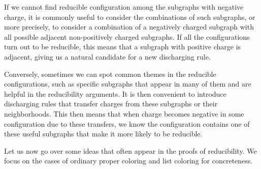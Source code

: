 \documentclass[12pt,twoside,openright,a4paper]{book}
\begin{document}
If we cannot find reducible configuration among the subgraphs with negative charge,
it is commonly useful to consider the combinations of such subgraphs, or more precisely, to consider a combination
of a negatively charged subgraph with all possible adjacent non-positively charged subgraphs.
If all the configurations turn out to be reducible, this means that a subgraph with positive charge is adjacent,
giving us a natural candidate for a new discharging rule.

Conversely, sometimes we can spot common themes in the reducible configurations, such as specific subgraphs
that appear in many of them and are helpful in the reducibility arguments. It is then convenient to introduce
discharging rules that transfer charges from these subgraphs or their neighborhoods.  This then means that
when charge becomes negative in some configuration due to these transfers, we know the configuration contains
one of these useful subgraphs that make it more likely to be reducible.

Let us now go over some ideas that often appear in the proofs of reducibility.  We focus on the cases of
ordinary proper coloring and list coloring for concreteness.
\end{document}
